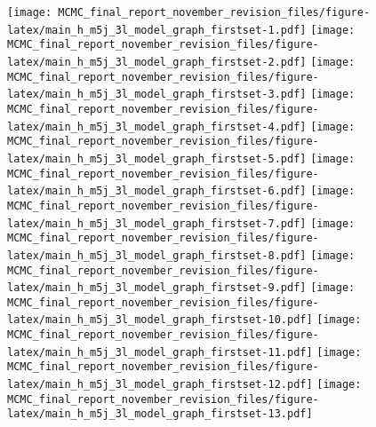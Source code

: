 \documentclass[]{article}
\begin{document}
\texttt{[image: MCMC\_final\_report\_november\_revision\_files/figure-latex/main\_h\_m5j\_3l\_model\_graph\_firstset-1.pdf]}
\texttt{[image: MCMC\_final\_report\_november\_revision\_files/figure-latex/main\_h\_m5j\_3l\_model\_graph\_firstset-2.pdf]}
\texttt{[image: MCMC\_final\_report\_november\_revision\_files/figure-latex/main\_h\_m5j\_3l\_model\_graph\_firstset-3.pdf]}
\texttt{[image: MCMC\_final\_report\_november\_revision\_files/figure-latex/main\_h\_m5j\_3l\_model\_graph\_firstset-4.pdf]}
\texttt{[image: MCMC\_final\_report\_november\_revision\_files/figure-latex/main\_h\_m5j\_3l\_model\_graph\_firstset-5.pdf]}
\texttt{[image: MCMC\_final\_report\_november\_revision\_files/figure-latex/main\_h\_m5j\_3l\_model\_graph\_firstset-6.pdf]}
\texttt{[image: MCMC\_final\_report\_november\_revision\_files/figure-latex/main\_h\_m5j\_3l\_model\_graph\_firstset-7.pdf]}
\texttt{[image: MCMC\_final\_report\_november\_revision\_files/figure-latex/main\_h\_m5j\_3l\_model\_graph\_firstset-8.pdf]}
\texttt{[image: MCMC\_final\_report\_november\_revision\_files/figure-latex/main\_h\_m5j\_3l\_model\_graph\_firstset-9.pdf]}
\texttt{[image: MCMC\_final\_report\_november\_revision\_files/figure-latex/main\_h\_m5j\_3l\_model\_graph\_firstset-10.pdf]}
\texttt{[image: MCMC\_final\_report\_november\_revision\_files/figure-latex/main\_h\_m5j\_3l\_model\_graph\_firstset-11.pdf]}
\texttt{[image: MCMC\_final\_report\_november\_revision\_files/figure-latex/main\_h\_m5j\_3l\_model\_graph\_firstset-12.pdf]}
\texttt{[image: MCMC\_final\_report\_november\_revision\_files/figure-latex/main\_h\_m5j\_3l\_model\_graph\_firstset-13.pdf]}
\end{document}
